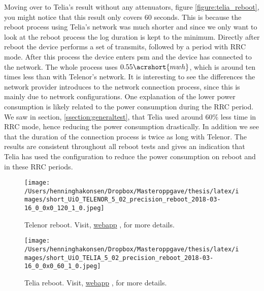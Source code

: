 \documentclass[USenglish]{ifimaster}  %
\begin{document}
Moving over to Telia's result without any attenuators, figure \vref{figure:telia_reboot}, you might notice that this result only covers 60 seconds. This is because the reboot process using Telia's network was much shorter and since we only want to look at the reboot process the log duration is kept to the minimum. Directly after reboot the device performs a set of transmits, followed by a period with RRC mode. After this process the device enters \acrshort{psm} and the device has connected to the network. The whole process uses ${0.55 \acrshort{mwh}}$, which is around ten times less than with Telenor's network. It is interesting to see the differences the network provider introduces to the network connection process, since this is mainly due to network configurations. One explanation of the lower power consumption is likely related to the power consumption during the RRC period. We saw in section, \vref{ssection:generaltest}, that Telia used around 60\% less time in RRC mode, hence reducing the power consumption drastically. In addition we see that the duration of the connection process is twice as long with Telenor. The results are consistent throughout all reboot tests and gives an indication that Telia has used the configuration to reduce the power consumption on reboot and in these RRC periods.

\begin{figure}[H]
  \centering
  \texttt{[image: /Users/henninghakonsen/Dropbox/Masteroppgave/thesis/latex/images/short\_UiO\_TELENOR\_5\_02\_precision\_reboot\_2018-03-16\_0\_0x0\_120\_1\_0.jpeg]}
  \caption{Telenor reboot. Visit, \href{http://158.39.77.97:9000/\#/results/UiO\_TELENOR\_5.02\_precision\_reboot\_2018-03-16\_0\_0x0\_120\_1\_0}{webapp} \cite{online:result9}, for more details.}
  \label{figure:telenor_reboot}
\end{figure}

\begin{figure}[H]
  \centering
  \texttt{[image: /Users/henninghakonsen/Dropbox/Masteroppgave/thesis/latex/images/short\_UiO\_TELIA\_5\_02\_precision\_reboot\_2018-03-16\_0\_0x0\_60\_1\_0.jpeg]}
  \caption{Telia reboot. Visit, \href{http://158.39.77.97:9000/\#/results/UiO\_TELIA\_5.02\_precision\_reboot\_2018-03-16\_0\_0x0\_60\_1\_0}{webapp} \cite{online:result10}, for more details.}
  \label{figure:telia_reboot}
\end{figure}
\end{document}
